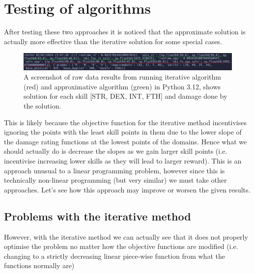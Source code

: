 \documentclass{article}
\begin{document}
\section{Testing of algorithms}
After testing these two approaches it is noticed that the approximate solution is actually more effective than the iterative solution for some special cases.
\begin{figure}[!h]
    \centering
    \includegraphics[width=\textwidth]{Dark Souls Respeccing Problem Solution/special_case_simplex_edited.png}
    \caption{A screenshot of raw data results from running iterative algorithm (red) and approximative algorithm (green) in Python 3.12, shows solution for each skill [STR, DEX, INT, FTH] and damage done by the solution.}
    \label{fig:screenshot-results}
\end{figure}
\par This is likely because the objective function for the iterative method incentivises ignoring the points with the least skill points in them due to the lower slope of the damage rating functions at the lowest points of the domains. Hence what we should actually do is decrease the slopes as we gain larger skill points (i.e. incentivise increasing lower skills as they will lead to larger reward). This is an approach unusual to a linear programming problem, however since this is technically non-linear programming (but very similar) we must take other approaches. Let's see how this approach may improve or worsen the given results.
\subsection{Problems with the iterative method}
However, with the iterative method we can actually see that it does not properly optimise the problem no matter how the objective functions are modified (i.e. changing to a strictly decreasing linear piece-wise function from what the functions normally are)

\printbibliography[heading=bibintoc, title={Bibliography}]
\end{document}
